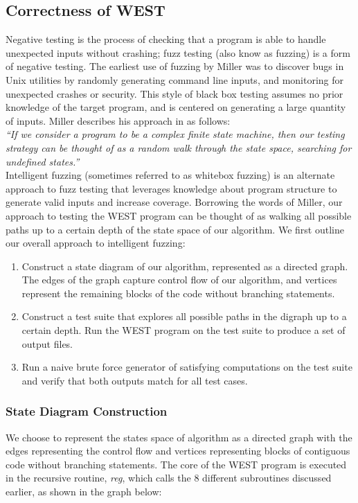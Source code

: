 \documentclass[runningheads]{llncs}
\begin{document}
\subsection{Correctness of WEST}
 Negative testing is the process of checking that a program is able to handle unexpected inputs without crashing; fuzz testing (also know as fuzzing) is a form of negative testing.
The earliest use of fuzzing by Miller \cite{Miller} was to discover bugs in Unix utilities by randomly generating command line inputs, and monitoring for unexpected crashes or security. This style of black box testing assumes no prior knowledge of the target program, and is centered on generating a large quantity of inputs. Miller describes his approach in \cite{Miller} as follows: \\

 \textit{``If we consider a program to
be a complex finite state machine, then our testing strategy can be thought of as a random walk through the state space, searching for undefined states.''} \\

Intelligent fuzzing (sometimes referred to as whitebox fuzzing) is an alternate approach to fuzz testing that leverages knowledge about program structure to generate valid inputs and increase coverage. 
Borrowing the words of Miller, our approach to testing the WEST program can be thought of as walking all possible paths up to a certain depth of the state space of our algorithm. 
We first outline our overall approach to intelligent fuzzing: 
\begin{enumerate}
    \item Construct a state diagram of our algorithm, represented as a directed graph. 
    The edges of the graph capture control flow of our algorithm, and vertices represent the remaining blocks of the code without branching statements.  
    \item Construct a test suite that explores all possible paths in the digraph up to a certain depth. Run the WEST program on the test suite to produce a set of output files.
    \item Run a naive brute force generator of satisfying computations on the test suite and verify that both outputs match for all test cases.
\end{enumerate}

\subsubsection{State Diagram Construction}
 We choose to represent the states space of algorithm as a directed graph with the edges representing the control flow and vertices representing blocks of contiguous code without branching statements. 
The core of the WEST program is executed in the recursive routine, \textit{reg}, which calls the $8$ different subroutines discussed earlier, as shown in the graph below: 
\end{document}
